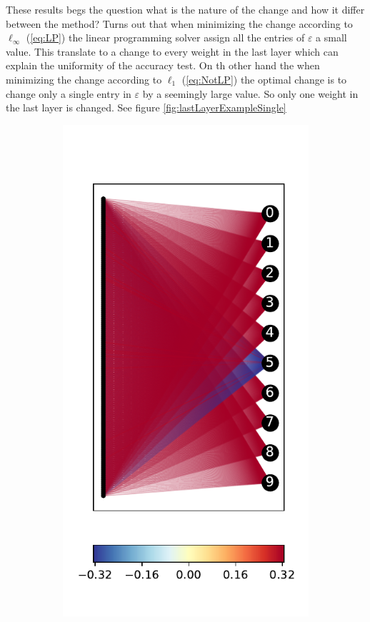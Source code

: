 \documentclass{easychair}
\begin{document}
These results begs the question what is the nature of the change and how it differ between the method? Turns out that when minimizing the change according to $\ell_\infty$ (\ref{eq:LP}) the linear programming solver assign all the entries of $\varepsilon$ a small value. This translate to a change to every weight in the last layer which can explain the uniformity of the accuracy test. On th other hand the when minimizing the change according to $\ell_1$ (\ref{eq:NotLP}) the optimal change is to change only a single entry in $\varepsilon$ by a seemingly large value. So only one weight in the last layer is changed. See figure \ref{fig:lastLayerExampleSingle}
\\
 
\begin{figure}
\centering
  \begin{subfigure}{0.4\linewidth}
  \includegraphics[width=\linewidth]{../data/results/problem3/last_layer_1_wm_example.pdf}

\end{subfigure}
\end{figure}
\end{document}

